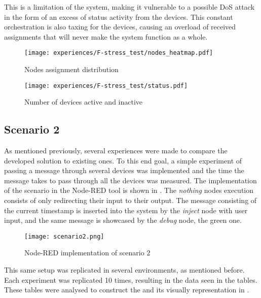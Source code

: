 This is a limitation of the system, making it vulnerable to a possible DoS attack in the form of an excess of status activity from the devices. This constant orchestration is also taxing for the devices, causing an overload of received assignments that will never make the system function as a whole.

\begin{figure*}[h]
    \centering
    \texttt{[image: experiences/F-stress\_test/nodes\_heatmap.pdf]}
    \caption[Nodes assignment distribution]{Nodes assignment distribution}\label{fig:stress_test_nodes}
\end{figure*}

\begin{figure}[h]
\centering
\texttt{[image: experiences/F-stress\_test/status.pdf]}
\caption[Number of devices active and inactive]{Number of devices active and inactive}\label{fig:stress_test_status}
\end{figure}


\subsection{Scenario 2}\label{sec:discussion_scenario2}

As mentioned previously, several experiences were made to compare the developed solution to existing ones. To this end goal, a simple experiment of passing a message through several devices was implemented and the time the message takes to pass through all the devices was measured. The implementation of the scenario in the Node-RED tool is shown in . The \textit{nothing} nodes execution consists of only redirecting their input to their output. The message consisting of the current timestamp is inserted into the system by the \textit{inject} node with user input, and the same message is showcased by the \textit{debug} node, the green one.

\begin{figure}[h]
\centering
\texttt{[image: scenario2.png]}
\caption[Node-RED implementation of scenario 2]{Node-RED implementation of scenario 2}\label{fig:scenario2_node_red}
\end{figure}

This same setup was replicated in several environments, as mentioned before. Each experiment was replicated 10 times, resulting in the data seen in the  tables. These tables were analysed to construct the  and its visually representation in .

